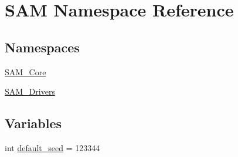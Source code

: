 \hypertarget{namespaceSAM}{}\section{S\+AM Namespace Reference}
\label{namespaceSAM}
\subsection*{Namespaces}
\begin{DoxyCompactItemize}
\item 
 \hyperlink{namespaceSAM_1_1SAM__Core}{S\+A\+M\+\_\+\+Core}
\item 
 \hyperlink{namespaceSAM_1_1SAM__Drivers}{S\+A\+M\+\_\+\+Drivers}
\end{DoxyCompactItemize}
\subsection*{Variables}
\begin{DoxyCompactItemize}
\item 
int \hyperlink{group__icubclient__SAM__source_ga161f34370db931f9dc1648dddb17f44b}{default\+\_\+seed} = 123344
\end{DoxyCompactItemize}
